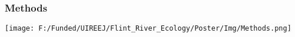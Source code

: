\documentclass[10pt]{beamer}
\newcommand{\iast}{\item[$\circledast$]}
\begin{document}

\begin{frame}
    \frametitle{Methods} %
    \centering
    \texttt{[image: F:/Funded/UIREEJ/Flint\_River\_Ecology/Poster/Img/Methods.png]} \\
\end{frame}
\end{document}
